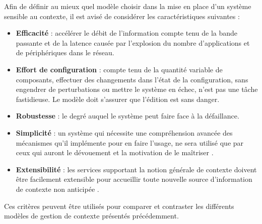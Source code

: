 Afin de définir au mieux quel modèle choisir dans la mise en place d'un système
sensible au contexte, il est avisé de considérer les caractéristiques suivantes
:

\begin{itemize}
    \item \textbf{Efficacité} : 
        accélérer le débit de l'information compte tenu de la bande passante
        et de la latence causée par l'explosion du nombre d'applications et
        de périphériques dans le réseau.
    \item \textbf{Effort de configuration} : 
        compte tenu de la quantité variable de composants, effectuer des
        changements dans l'état de la configuration, sans engendrer de
        perturbations ou mettre le système en échec, n'est pas une tâche
        fastidieuse. Le modèle doit s'assurer que l'édition est sans danger.
    \item \textbf{Robustesse} : 
        le degré auquel le système peut faire face à la défaillance.
    \item \textbf{Simplicité} : 
            un système qui nécessite une compréhension avancée des mécanismes
            qu'il implémente pour en faire l'usage, ne sera utilisé que par ceux
            qui auront le dévouement et la motivation de le maîtriser
            \cite{winograd_architectures_2001}.
    \item \textbf{Extensibilité} : 
            les services supportant la notion générale de contexte doivent
            être facilement extensible pour accueillir toute nouvelle source
            d'information de contexte non anticipée \cite{ebling_issues_2001}.
\end{itemize}

Ces critères peuvent être utilisés pour comparer et contraster les différents
modèles de gestion de contexte présentés précédemment.

